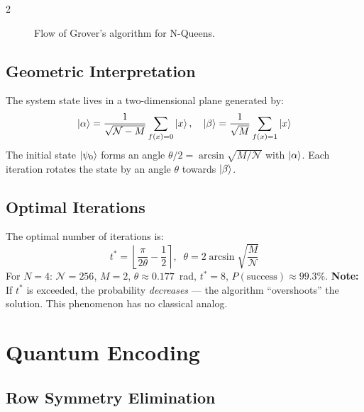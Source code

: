 \documentclass[9pt, a4paper]{extarticle}
\begin{document}
\begin{multicols}{2}
\begin{figure}[H]
{
    }
    \caption{Flow of Grover's algorithm for N-Queens.}
    \label{fig:high_level}
\end{figure}

\subsection{Geometric Interpretation}

The system state lives in a two-dimensional plane generated by:
\begin{equation}
    \ket{\alpha} = \frac{1}{\sqrt{\mathcal{N}-M}} \sum_{f(x)=0} \ket{x},\quad
    \ket{\beta} = \frac{1}{\sqrt{M}} \sum_{f(x)=1} \ket{x}
\end{equation}
The initial state $\ket{\psi_0}$ forms an angle $\theta/2 = \arcsin\sqrt{M/\mathcal{N}}$ with $\ket{\alpha}$. Each iteration rotates the state by an angle $\theta$ towards $\ket{\beta}$.

\subsection{Optimal Iterations}

The optimal number of iterations is:
\begin{equation}
    t^* = \left\lfloor \frac{\pi}{2\theta} - \frac{1}{2} \right\rceil,\;\;
    \theta = 2\arcsin\!\sqrt{\frac{M}{\mathcal{N}}}
\end{equation}
For $N\!=\!4$: $\mathcal{N}\!=\!256$, $M\!=\!2$, $\theta \approx 0.177$~rad, $t^*\!=\!8$, $P(\text{success})\!\approx\!99.3\%$.
\textbf{Note:} If $t^*$ is exceeded, the probability \emph{decreases} --- the algorithm ``overshoots'' the solution. This phenomenon has no classical analog.

\section{Quantum Encoding}

\subsection{Row Symmetry Elimination}


\end{multicols}
\end{document}
